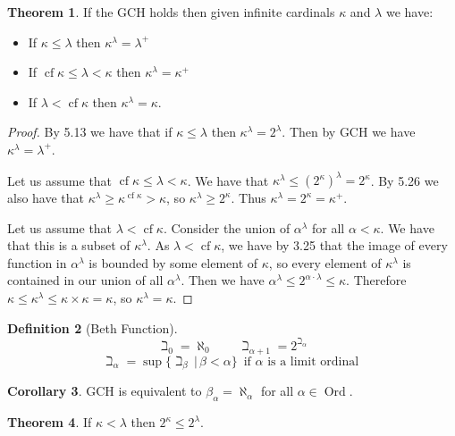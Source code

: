 \documentclass{article}
\theoremstyle{definition}
\newtheorem{thm}{Theorem}[section]
\newtheorem{crly}[thm]{Corollary}
\newtheorem{defn}[thm]{Definition}
\DeclareMathOperator{\Ord}{Ord}
\DeclareMathOperator{\cf}{cf}
\begin{document}
\begin{thm}
    If the GCH holds then given infinite cardinals $\kappa$ and $\lambda$ we have:
    \begin{itemize}
        \item If $\kappa \le \lambda$ then $\kappa^\lambda = \lambda^+$
        \item If $\cf \kappa \le \lambda < \kappa$ then $\kappa^\lambda = \kappa^+$
        \item If $\lambda < \cf \kappa$ then $\kappa^\lambda = \kappa$.
    \end{itemize}
\end{thm}

\begin{proof}
    By 5.13 we have that if $\kappa \le \lambda$ then $\kappa^\lambda = 2^\lambda$. Then by GCH we have $\kappa^\lambda = \lambda^+$.

    Let us assume that $\cf \kappa \le \lambda < \kappa$. We have that $\kappa^\lambda \le (2^\kappa)^\lambda = 2^\kappa$. By 5.26 we also have that $\kappa^{\lambda} \ge \kappa^{\cf \kappa} > \kappa$, so $\kappa^\lambda \ge 2^\kappa$. Thus $\kappa^\lambda = 2^\kappa = \kappa^+$.

    Let us assume that $\lambda < \cf \kappa$. Consider the union of $\alpha^\lambda$ for all $\alpha < \kappa$. We have that this is a subset of $\kappa^\lambda$. As $\lambda < \cf \kappa$, we have by 3.25 that the image of every function in $\alpha^\lambda$ is bounded by some element of $\kappa$, so every element of $\kappa^\lambda$ is contained in our union of all $\alpha^\lambda$. Then we have $\alpha^\lambda \le 2^{\alpha \cdot \lambda} \le \kappa$. Therefore $\kappa \le \kappa^\lambda \le \kappa \times \kappa = \kappa$, so $\kappa^\lambda = \kappa$.
\end{proof}

\begin{defn}[Beth Function]
    \[
        \beth_0 = \aleph_0 \quad\quad \beth_{\alpha + 1} = 2^{\beth_\alpha}
    \]
    \[
        \beth_{\alpha} = \sup\{ \beth_\beta \, | \, \beta < \alpha \} \, \text{ if $\alpha$ is a limit ordinal }
    \]
\end{defn}

\begin{crly}
    GCH is equivalent to $\beta_{\alpha} = \aleph_\alpha$ for all $\alpha \in \Ord$.
\end{crly}

\begin{thm}
    If $\kappa < \lambda$ then $2^\kappa \le 2^\lambda$.
\end{thm}
\end{document}
